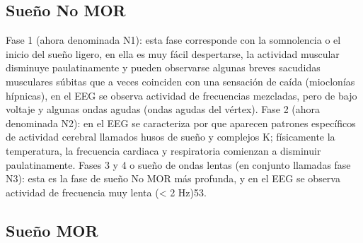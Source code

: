 \documentclass[12pt,a4paper]{mitthesis}
\begin{document}

\subsection{Sueño No MOR}

Fase 1 (ahora denominada N1): esta fase corresponde con la somnolencia o el inicio del sueño ligero, en ella es muy fácil despertarse, la actividad muscular disminuye paulatinamente y pueden observarse algunas breves sacudidas musculares súbitas que a veces coinciden con una sensación de caída (mioclonías hípnicas), en el EEG se observa actividad de frecuencias mezcladas, pero de bajo voltaje y algunas ondas agudas (ondas agudas del vértex). Fase 2 (ahora denominada N2): en el EEG se caracteriza por que aparecen patrones específicos de actividad cerebral llamados husos de sueño y complejos K; físicamente la temperatura, la frecuencia cardiaca y respiratoria comienzan a disminuir paulatinamente. Fases 3 y 4 o sueño de ondas lentas (en conjunto llamadas fase N3): esta es la fase de sueño No MOR más profunda, y en el EEG se observa actividad de frecuencia muy lenta (< 2 Hz)53.


\subsection{Sueño MOR}
\end{document}
